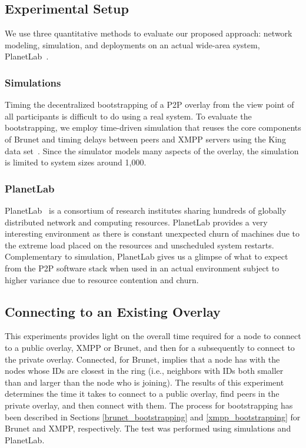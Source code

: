 \documentclass[conference]{IEEEtran}
\begin{document}
\subsection{Experimental Setup}

We use three quantitative methods to evaluate our proposed approach: network
modeling, simulation, and deployments on an actual wide-area system,
PlanetLab~\cite{planetlab}.

\subsubsection{Simulations}

Timing the decentralized bootstrapping of a P2P overlay from the view point of
all participants is difficult to do using a real system.  To evaluate the
bootstrapping, we employ time-driven simulation that reuses the core components
of Brunet and timing delays between peers and XMPP servers using the King data
set~\cite{king_data}.  Since the simulator models many aspects of the overlay,
the simulation is limited to system sizes around 1,000.

\subsubsection{PlanetLab}

PlanetLab~\cite{planetlab} is a consortium of research institutes sharing
hundreds of globally distributed network and computing resources.  PlanetLab
provides a very interesting environment as there is constant unexpected churn
of machines due to the extreme load placed on the resources and unscheduled
system restarts.  Complementary to simulation, PlanetLab gives us a glimpse of
what to expect from the P2P software stack when used in an actual environment
subject to higher variance due to resource contention and churn.

\subsection{Connecting to an Existing Overlay}

This experiments provides light on the overall time required for a node to
connect to a public overlay, XMPP or Brunet, and then for a subsequently to
connect to the private overlay.  Connected, for Brunet, implies that a node has
with the nodes whose IDs are closest in the ring (i.e., neighbors with IDs both
smaller than and larger than the node who is joining).  The results of this
experiment determines the time it takes to connect to a public overlay, find
peers in the private overlay, and then connect with them.  The process for
bootstrapping has been described in Sections \ref{brunet_bootstrapping} and
\ref{xmpp_bootstrapping} for Brunet and XMPP, respectively.  The test was
performed using simulations and PlanetLab.
\end{document}
